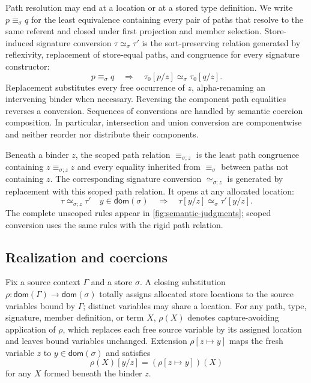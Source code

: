 \documentclass[acmsmall,screen,nonacm]{acmart}
\newcommand{\subst}[3]{#1[#2/#3]}
\begin{document}
Path resolution may end at a location or at a stored type definition. We
write \(p\equiv_\sigma q\) for the least equivalence containing every pair
of paths that resolve to the same referent and closed under first projection
and member selection. Store-induced signature conversion
\(\tau\simeq_\sigma\tau'\) is the sort-preserving relation generated by
reflexivity, replacement of store-equal paths, and congruence for every
signature constructor:
\[
  p\equiv_\sigma q
  \quad\Longrightarrow\quad
  \subst{\tau_0}{p}{z}\simeq_\sigma\subst{\tau_0}{q}{z}.
\]
Replacement substitutes every free occurrence of \(z\), alpha-renaming an
intervening binder when necessary. Reversing the component path equalities
reverses a conversion. Sequences of conversions are handled by semantic
coercion composition. In particular, intersection and union conversion are
componentwise and neither reorder nor distribute their components.

Beneath a binder \(z\), the scoped path relation
\(\equiv_{\sigma;z}\) is the least path congruence containing
\(z\equiv_{\sigma;z}z\) and every equality inherited from
\(\equiv_\sigma\) between paths not containing \(z\). The corresponding
signature conversion \(\simeq_{\sigma;z}\) is generated by replacement with
this scoped path relation. It opens at any allocated location:
\[
  \tau\simeq_{\sigma;z}\tau'
  \quad y\in\mathsf{dom}(\sigma)
  \quad\Longrightarrow\quad
  \subst{\tau}{y}{z}\simeq_\sigma\subst{\tau'}{y}{z}.
\]
The complete unscoped rules appear in
\cref{fig:semantic-judgments}; scoped conversion uses the same rules with the
rigid path relation.

\subsection{Realization and coercions}

Fix a source context \(\Gamma\) and a store \(\sigma\). A closing
substitution \(\rho:\mathsf{dom}(\Gamma)\longrightarrow\mathsf{dom}(\sigma)\)
totally assigns allocated store locations to the source variables bound by
\(\Gamma\); distinct variables may share a location. For any path, type,
signature, member definition, or term \(X\), \(\rho(X)\) denotes
capture-avoiding application of \(\rho\), which replaces each free source
variable by its assigned location and leaves bound variables unchanged.
Extension \(\rho[z\mapsto y]\) maps the fresh variable \(z\) to
\(y\in\mathsf{dom}(\sigma)\) and satisfies
\[
  \subst{\rho(X)}{y}{z}=(\rho[z\mapsto y])(X)
\]
for any \(X\) formed beneath the binder \(z\).
\end{document}
